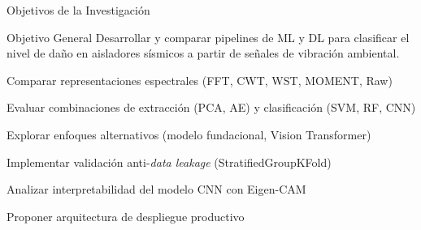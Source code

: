 \documentclass[aspectratio=169, 11pt]{beamer}
\begin{document}
\begin{frame}{Objetivos de la Investigación}
    \small
    \begin{block}{Objetivo General}
        \small Desarrollar y comparar pipelines de ML y DL para clasificar el nivel de daño en aisladores sísmicos a partir de señales de vibración ambiental.
    \end{block}
    \vspace{-0.1cm}
    \begin{description}
        \setlength\itemsep{0.1em}
        \item[\textbf{OE1:}] Comparar representaciones espectrales (FFT, CWT, WST, MOMENT, Raw)
        \item[\textbf{OE2:}] Evaluar combinaciones de extracción (PCA, AE) y clasificación (SVM, RF, CNN)
        \item[\textbf{OE3:}] Explorar enfoques alternativos (modelo fundacional, Vision Transformer)
        \item[\textbf{OE4:}] Implementar validación anti-\textit{data leakage} (StratifiedGroupKFold)
        \item[\textbf{OE5:}] Analizar interpretabilidad del modelo CNN con Eigen-CAM
        \item[\textbf{OE6:}] Proponer arquitectura de despliegue productivo
    \end{description}
\end{frame}
\end{document}
